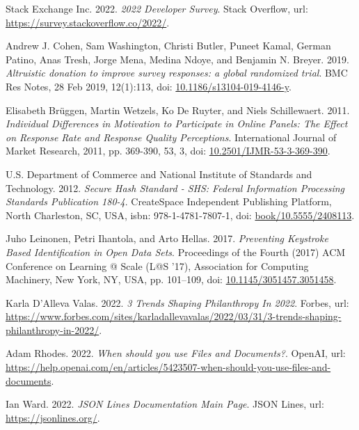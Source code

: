 \begin{thebibliography}{99}
 Stack Exchange Inc. 2022. \textit{2022 Developer Survey}. Stack Overflow, url: \url{https://survey.stackoverflow.co/2022/}.

 Andrew J. Cohen, Sam Washington, Christi Butler, Puneet Kamal, German Patino, Anas Tresh, Jorge Mena, Medina Ndoye, and Benjamin N. Breyer. 2019. \textit{Altruistic donation to improve survey responses: a global randomized trial}. BMC Res Notes, 28 Feb 2019, 12(1):113, doi: \href{https://doi.org/10.1186/s13104-019-4146-y}{10.1186/s13104-019-4146-y}.

 Elisabeth Brüggen, Martin Wetzels, Ko De Ruyter, and Niels Schillewaert. 2011. \textit{Individual Differences in Motivation to Participate in Online Panels: The Effect on Response Rate and Response Quality Perceptions}. International Journal of Market Research, 2011, pp. 369-390, 53, 3, doi: \href{https://doi.org/10.2501/IJMR-53-3-369-390}{10.2501/IJMR-53-3-369-390}.

 U.S. Department of Commerce and National Institute of Standards and Technology. 2012. \textit{Secure Hash Standard - SHS: Federal Information Processing Standards Publication 180-4}. CreateSpace Independent Publishing Platform, North Charleston, SC, USA, isbn: 978-1-4781-7807-1, doi: \href{https://dl.acm.org/doi/book/10.5555/2408113}{book/10.5555/2408113}.

 Juho Leinonen, Petri Ihantola, and Arto Hellas. 2017. \textit{Preventing Keystroke Based Identification in Open Data Sets}. Proceedings of the Fourth (2017) ACM Conference on Learning @ Scale (L@S '17), Association for Computing Machinery, New York, NY, USA, pp. 101–109, doi: \href{https://doi.org/10.1145/3051457.3051458}{10.1145/3051457.3051458}.

 Karla D’Alleva Valas. 2022. \textit{3 Trends Shaping Philanthropy In 2022}. Forbes, url: \url{https://www.forbes.com/sites/karladallevavalas/2022/03/31/3-trends-shaping-philanthropy-in-2022/}.

 Adam Rhodes. 2022. \textit{When should you use Files and Documents?}. OpenAI, url: \url{https://help.openai.com/en/articles/5423507-when-should-you-use-files-and-documents}.

 Ian Ward. 2022. \textit{JSON Lines Documentation Main Page}. JSON Lines, url: \url{https://jsonlines.org/}.


\end{thebibliography}
